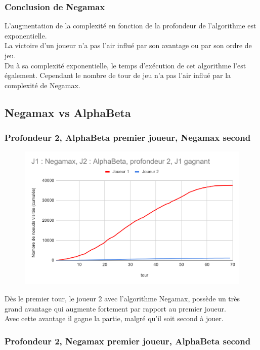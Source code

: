 \documentclass[12pt]{article}
\begin{document}
\subsubsection{Conclusion de Negamax}

L’augmentation de la complexité en fonction de la profondeur de l’algorithme est exponentielle.\\
La victoire d’un joueur n’a pas l’air influé par son avantage ou par son ordre de jeu.\\
Du à sa complexité exponentielle, le temps d’exécution de cet algorithme l’est également.
Cependant le nombre de tour de jeu n'a pas l'air influé par la complexité de Negamax.

\newpage
\subsection{Negamax vs AlphaBeta}

\subsubsection{Profondeur 2, AlphaBeta premier joueur, Negamax second}

\begin{figure}[!h]
   \includegraphics[width=\textwidth]{prof2alphaVSnegamax.png}
\end{figure}

Dès le premier tour, le joueur 2 avec l'algorithme Negamax, possède un très grand avantage qui augmente fortement par rapport au premier joueur.\\
Avec cette avantage il gagne la partie, malgré qu'il soit second à jouer.

\newpage
\subsubsection{Profondeur 2, Negamax premier joueur, AlphaBeta second}
\end{document}
